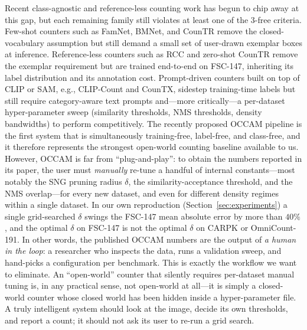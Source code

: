 \documentclass[letterpaper]{article}
\begin{document}
Recent class-agnostic and reference-less counting work \citep{example2026} has begun to chip away at this gap, but each remaining family still violates at least one of the 3-free criteria. Few-shot counters such as FamNet, BMNet, and CounTR remove the closed-vocabulary assumption but still demand a small set of user-drawn exemplar boxes at inference. Reference-less counters such as RCC and zero-shot CounTR remove the exemplar requirement but are trained end-to-end on FSC-147, inheriting its label distribution and its annotation cost. Prompt-driven counters built on top of CLIP or SAM, e.g., CLIP-Count and CounTX, sidestep training-time labels but still require category-aware text prompts and---more critically---a per-dataset hyper-parameter sweep (similarity thresholds, NMS thresholds, density bandwidths) to perform competitively. The recently proposed OCCAM pipeline \citep{example2026} is the first system that is simultaneously training-free, label-free, and class-free, and it therefore represents the strongest open-world counting baseline available to us. However, OCCAM is far from ``plug-and-play'': to obtain the numbers reported in its paper, the user must \emph{manually} re-tune a handful of internal constants---most notably the SNG pruning radius $\delta$, the similarity-acceptance threshold, and the NMS overlap---for every new dataset, and even for different density regimes within a single dataset. In our own reproduction (Section~\ref{sec:experiments}) a single grid-searched $\delta$ swings the FSC-147 mean absolute error by more than $40\%$, and the optimal $\delta$ on FSC-147 is not the optimal $\delta$ on CARPK or OmniCount-191. In other words, the published OCCAM numbers are the output of \emph{a human in the loop}: a researcher who inspects the data, runs a validation sweep, and hand-picks a configuration per benchmark. This is exactly the workflow we want to eliminate. An ``open-world'' counter that silently requires per-dataset manual tuning is, in any practical sense, not open-world at all---it is simply a closed-world counter whose closed world has been hidden inside a hyper-parameter file. A truly intelligent system should look at the image, decide its own thresholds, and report a count; it should not ask its user to re-run a grid search.
\end{document}
